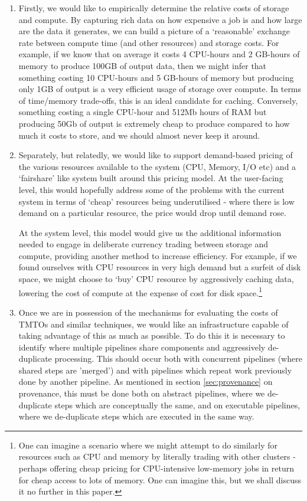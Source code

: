 \documentclass[10pt,a4paper]{article}
\begin{document}
\begin{enumerate}
\item Firstly, we would like to empirically determine the relative costs of storage and compute. By capturing rich data on how expensive a job is and how large are the data it generates, we can build a picture of a `reasonable' exchange rate between compute time (and other resources) and storage costs. For example, if we know that on average it costs 4 CPU-hours and 2 GB-hours of memory to produce 100GB of output data, then we might infer that something costing 10 CPU-hours and 5 GB-hours of memory but producing only 1GB of output is a very efficient usage of storage over compute. In terms of time/memory trade-offs, this is an ideal candidate for caching. Conversely, something costing a single CPU-hour and 512Mb hours of RAM but producing 50Gb of output is extremely cheap to produce compared to how much it costs to store, and we should almost never keep it around.

\item Separately, but relatedly, we would like to support demand-based pricing of the various resources available to the system (CPU, Memory, I/O etc) and a `fairshare' like system built around this pricing model. At the user-facing level, this would hopefully address some of the problems with the current system in terms of `cheap' resources being underutilised - where there is low demand on a particular resource, the price would drop until demand rose.

At the system level, this model would give us the additional information needed to engage in deliberate currency trading between storage and compute, providing another method to increase efficiency. For example, if we found ourselves with CPU resources in very high demand but a surfeit of disk space, we might choose to `buy' CPU resource by aggressively caching data, lowering the cost of compute at the expense of cost for disk space.\footnote{One can imagine a scenario where we might attempt to do similarly for resources such as CPU and memory by literally trading with other clusters - perhaps offering cheap pricing for CPU-intensive low-memory jobs in return for cheap access to lots of memory. One can imagine this, but we shall discuss it no further in this paper.}

\item Once we are in possession of the mechanisms for evaluating the costs of TMTOs and similar techniques, we would like an infrastructure capable of taking advantage of this as much as possible. To do this it is necessary to identify where multiple pipelines share components and aggressively de-duplicate processing. This should occur both with concurrent pipelines (where shared steps are 'merged') and with pipelines which repeat work previously done by another pipeline. As mentioned in section \ref{sec:provenance} on provenance, this must be done both on abstract pipelines, where we de-duplicate steps which are conceptually the same, and on executable pipelines, where we de-duplicate steps which are executed in the same way.


\end{enumerate}
\end{document}
